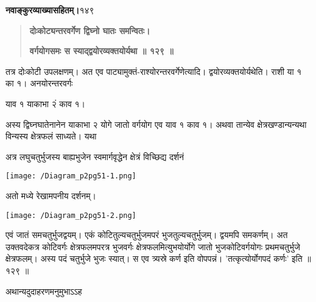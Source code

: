 \documentclass[11pt, openany]{book}
\begin{document}
\onehalfspacing
\hspace{2in}\textbf{नवाङ्कुरव्याख्यासहितम्।}\hspace{2in}१४९

\vspace{5mm}

\begin{sloppypar}
\begin{center}\begin{quote}
\textbf{दोःकोट्यन्तरवर्गेण द्विघ्नो घातः समन्वितः।}

\textbf{वर्गयोगसमः स स्याद्द्वयोरव्यक्तयोर्यथा ॥ १२९ ॥}
\end{quote}\end{center}

\hangindent=0.2in \hspace{0.2in}तत्र दोःकोटी उपलक्षणम्। अत एव पाट्यामुक्तं-राश्योरन्तरवर्गेणेत्यादि। द्वयोरव्यक्तयोर्यथेति। राशी या १ का १। अनयोरन्तरवर्गः

\begin{center}
 याव १ याकाभा २ं काव १।
\end{center}

\hangindent=0.2in \hspace{0.2in}अस्य द्विघ्नघातेनानेन याकाभा २ योगे जातो वर्गयोग एव याव १ काव १। अथवा तान्येव क्षेत्रखण्डान्यन्यथा विन्यस्य क्षेत्रफलं साध्यते। यथा\textendash

\hangindent=0.2in \hspace{0.2in}अत्र लघुचतुर्भुजस्य बाह्यभुजेन स्वमार्गवृद्धेन क्षेत्रं विच्छिद्य दर्शनं

\begin{center}
    \texttt{[image: /Diagram\_p2pg51-1.png]}
\end{center}

\hangindent=0.2in \hspace{0.2in}अतो मध्ये रेखामपनीय दर्शनम्।

\begin{center}
    \texttt{[image: /Diagram\_p2pg51-2.png]}
\end{center}

\hangindent=0.2in \hspace{0.2in}एवं जातं समचतुर्भुजद्वयम्। एकं कोटितुल्यचतुर्भुजमपरं भुजतुल्यचतुर्भुजम्। द्वयमपि समकर्णम्। अत उक्तवदेकत्र कोटिवर्गः क्षेत्रफलमपरत्र भुजवर्गः क्षेत्रफलमित्युभयोर्योगे जातो भुजकोटिवर्गयोगः प्रथमचतुर्भुजे क्षेत्रफलम्। अस्य पदं चतुर्भुजे भुजः स्यात्। स एव त्र्यस्रे कर्ण इति वोपपन्नं। 'तत्कृत्योर्योगपदं कर्णः' इति ॥ १२९ ॥

\hangindent=0.2in \hspace{0.2in}अथान्यदुदाहरणमनुमुभाऽऽह\textendash


\end{sloppypar}
\end{document}
